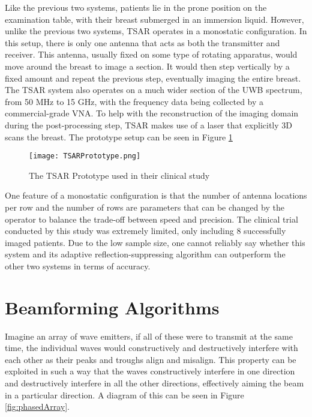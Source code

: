 Like the previous two systems, patients lie in the prone position on the examination table, with their breast submerged
in an immersion liquid. However, unlike the previous two systems, TSAR operates in a monostatic configuration. In this
setup, there is only one antenna that acts as both the transmitter and receiver. This antenna, usually fixed on some
type of rotating apparatus, would move around the breast to image a section. It would then step vertically by a fixed
amount and repeat the previous step, eventually imaging the entire breast. The TSAR system also operates on a much wider
section of the UWB spectrum, from 50 MHz to 15 GHz, with the frequency data being collected by a commercial-grade VNA.
To help with the reconstruction of the imaging domain during the post-processing step, TSAR makes use of a laser that
explicitly 3D scans the breast. The prototype setup can be seen in Figure \ref{fig:TSARPrototype} \hfill \break
\begin{figure}
    \texttt{[image: TSARPrototype.png]}
    \centering
    \caption{The TSAR Prototype used in their clinical study \cite{bourquiPrototypeSystemMeasuring2012}}
    \label{fig:TSARPrototype}
\end{figure}
One feature of a monostatic configuration is that the number of antenna locations per row and the number of rows are
parameters that can be changed by the operator to balance the trade-off between speed and precision. The clinical trial
conducted by this study was extremely limited, only including 8 successfully imaged patients. Due to the low sample
size, one cannot reliably say whether this system and its adaptive reflection-suppressing algorithm can outperform the
other two systems in terms of accuracy. \hfill 
\FloatBarrier
\section{Beamforming Algorithms}
\label{BeamformingAlgorithms}
Imagine an array of wave emitters, if all of these were to transmit at the same time, the individual waves would
constructively and destructively interfere with each other as their peaks and troughs align and misalign. This property
can be exploited in such a way that the waves constructively interfere in one direction and destructively interfere in
all the other directions, effectively aiming the beam in a particular direction. A diagram of this can be seen in Figure
\ref{fig:phasedArray}.

